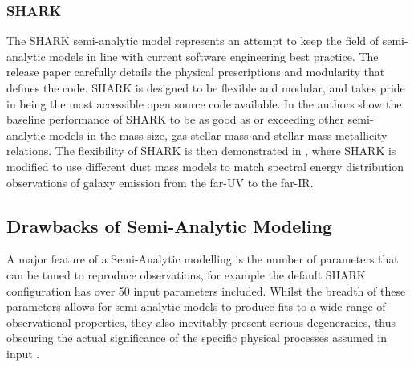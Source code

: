 \subsubsection{SHARK}
The SHARK semi-analytic model represents an attempt to keep the field of semi-analytic models in line with current software engineering best practice. The release paper \citep{Lagos2018Shark:Formation} carefully details the physical prescriptions and modularity that defines the code. SHARK is designed to be flexible and modular, and takes pride in being the most accessible open source code available. In \citet{Lagos2018Shark:Formation} the authors show the baseline performance of SHARK to be as good as or exceeding other semi-analytic models in the mass-size, gas-stellar mass and stellar mass-metallicity relations. The flexibility of SHARK is then demonstrated in \citet{Lagos2019FromModel}, where  SHARK is modified to use different dust mass models to match spectral energy distribution observations of galaxy emission from the far-UV to the far-IR.

\subsection{Drawbacks of Semi-Analytic Modeling}
A major feature of a Semi-Analytic modelling is the number of parameters that can be tuned to reproduce observations, for example the default SHARK configuration has over 50 input parameters included. Whilst the breadth of these parameters allows for semi-analytic models to produce fits to a wide range of observational properties, they also inevitably present serious degeneracies, thus obscuring the actual significance of the specific physical processes assumed in input \citep{Lapi2011DarkModels,Gonzalez2011Evolution4}.


